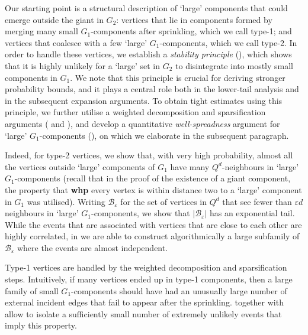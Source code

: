 \documentclass[reqno,final,a4paper]{amsart}
\theoremstyle{definition}
\newcommand{\cB}{\mathcal{B}}
\def\eps{\varepsilon}
\newcommand{\1}{\mathbbm{1}}
\begin{document}
Our starting point is a structural description of `large' components that could emerge outside the giant in $G_2$: vertices that lie in components formed by merging many small $G_1$-components after sprinkling, which we call type-1; and vertices that coalesce with a few `large' $G_1$-components, which we call type-2. In order to handle these vertices, we establish a \textit{stability principle} (), which shows that it is highly unlikely for a `large' set in $G_2$ to disintegrate into mostly small components in $G_1$. We note that this principle is crucial for deriving stronger probability bounds, and it plays a central role both in the lower-tail analysis and in the subsequent expansion arguments. To obtain tight estimates using this principle, we further utilise a weighted decomposition and sparsification arguments ( and ), and develop a quantitative \textit{well-spreadness} argument for `large' $G_1$-components (), on which we elaborate in the subsequent paragraph.

Indeed, for type-2 vertices, we show that, with very high probability, almost all the vertices outside `large' components of $G_1$ have many $Q^d$-neighbours in `large' $G_1$-components (recall that in the proof of the existence of a giant component, the property that \textbf{whp} every vertex is within distance two to a `large' component in $G_1$ was utilised). Writing $\mathcal B_\varepsilon$ for the set of vertices in $Q^d$ that see fewer than $\varepsilon d$ neighbours in `large' $G_1$-components, we show that $|\mathcal B_\varepsilon|$ has an exponential tail. While the events that are associated with vertices that are close to each other are highly correlated, in  we are able to construct algorithmically a large subfamily of $\cB_{\eps}$ where the events are almost independent. 

Type-1 vertices are handled by the weighted decomposition and sparsification steps. Intuitively, if many vertices ended up in type-1 components, then a large family of small $G_1$-components should have had an unusually large number of external incident edges that fail to appear after the sprinkling.  together with  allow to isolate a sufficiently small number of extremely unlikely events that imply this property.
\end{document}

